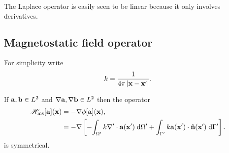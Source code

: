 The Laplace operator is easily seen to be linear because it only involves derivatives.


\subsection{Magnetostatic field operator}

For simplicity write
\begin{equation}
  \knl = \frac{1}{4\pi \abs{\xv - \xv'}}.
\end{equation}

\begin{theorem}
  If $\av, \bv \in \ltwo$ and $\grad \av, \grad\bv \in \ltwo$ then the operator
  \begin{equation}
    \begin{aligned}
      \hmsop [\av](\xv) &= - \grad \phim[\av](\xv), \\
      &= -\grad \left[-\intd[\magd']{\knl \nabla' \cdot \av(\xv')}
          + \intd[\boundd']{\knl \av(\xv') \cdot \nv(\xv')} \right].
    \end{aligned}
  \end{equation}
  is symmetrical.
\end{theorem}


